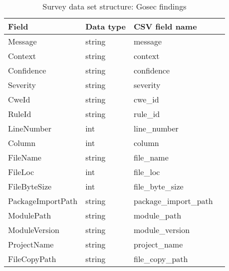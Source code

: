 \begin{table}[h]
    \centering
    \caption{Survey data set structure: Gosec findings}
    \label{tbl:datastructure-gosec-findings}
    \begin{tabular}{llll}
        \toprule
        Field & Data type & CSV field name \\
        \midrule
        Message              & string & message \\
        Context              & string & context \\
        Confidence           & string & confidence \\
        Severity             & string & severity \\
        CweId                & string & cwe\_id \\
        RuleId               & string & rule\_id \\
        LineNumber           & int    & line\_number \\
        Column               & int    & column \\
        FileName             & string & file\_name \\
        FileLoc              & int    & file\_loc \\
        FileByteSize         & int    & file\_byte\_size \\
        PackageImportPath    & string & package\_import\_path \\
        ModulePath           & string & module\_path \\
        ModuleVersion        & string & module\_version \\
        ProjectName          & string & project\_name \\
        FileCopyPath         & string & file\_copy\_path \\
        \bottomrule
    \end{tabular}
\end{table}


